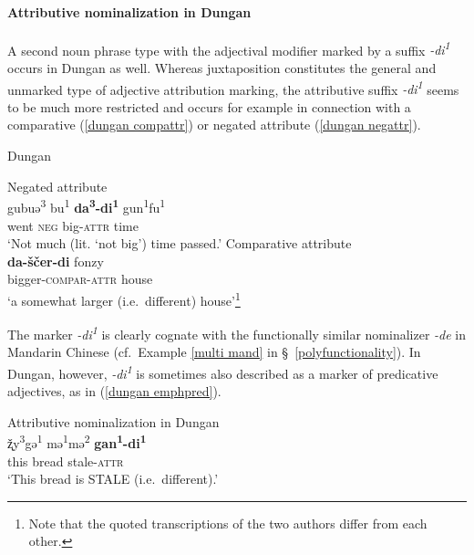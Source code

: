 \paragraph{Attributive nominalization in Dungan}
A second noun phrase type with the adjectival modifier marked by a suffix \textit{-di\textsuperscript{1}} occurs in Dungan as well. Whereas juxtaposition constitutes the general and unmarked type of adjective attribution marking, the attributive suffix \textit{-di\textsuperscript{1}} seems to be much more restricted and occurs for example in connection with a comparative (\ref{dungan compattr}) or negated attribute (\ref{dungan negattr}).
\begin{exe}
\ex \rm{Dungan}
\begin{xlist}
\ex \rm{Negated attribute \citep[80]{zevachina2001}}\\
\label{dungan negattr}
\gll	gubuə\textsuperscript{3} bu\textsuperscript{1} \textbf{da\textsuperscript{3}-di\textsuperscript{1}} gun\textsuperscript{1}fu\textsuperscript{1}\\
	went \textsc{neg} big-\textsc{attr} time\\
\glt	‘Not much (lit. ‘not big’) time passed.’
\ex \rm{Comparative attribute \citep[480]{kalimov1968}}\\
\label{dungan compattr}
\gll	\textbf{da-ščer-di} fonzy\\
	bigger-\textsc{compar}-\textsc{attr} house\\
\glt	‘a somewhat larger (i.e.~different) house’\footnote{Note that the quoted transcriptions of the two authors differ from each other.}
\end{xlist}
\end{exe}	
The marker \textit{-di\textsuperscript{1}} is clearly cognate with the functionally similar nominalizer \textit{-de} in Mandarin Chinese (cf.~Example \ref{multi mand} in \S~\ref{polyfunctionality}). In Dungan, however, \textit{-di\textsuperscript{1}} is sometimes also described as a marker of predicative adjectives, as in (\ref{dungan emphpred}).
\begin{exe}
\ex \rm{Attributive nominalization in Dungan \citep[82]{zevachina2001}}\\
\label{dungan emphpred}
\gll	ž̨y\textsuperscript{3}gə\textsuperscript{1} mə\textsuperscript{1}mə\textsuperscript{2} \textbf{gan\textsuperscript{1}-di\textsuperscript{1}}\\
	this bread stale-\textsc{attr}\\
\glt	‘This bread is STALE (i.e.~different).’
\end{exe}

